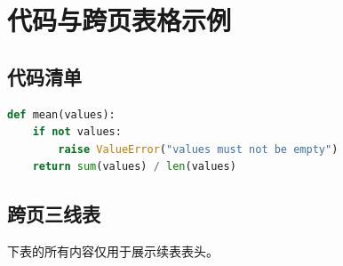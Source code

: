 \appendix
\section{代码与跨页表格示例}
\subsection{代码清单}
\begin{lstlisting}[language=Python,caption={Mean calculation example}]
def mean(values):
    if not values:
        raise ValueError("values must not be empty")
    return sum(values) / len(values)
\end{lstlisting}
\subsection{跨页三线表}
下表的所有内容仅用于展示续表表头。

